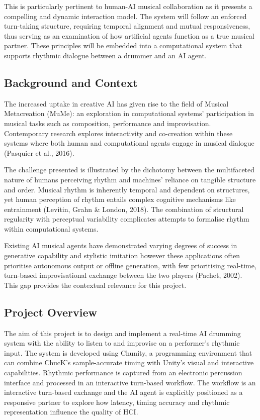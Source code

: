 \documentclass[11pt,a4paper]{article}
\begin{document}
This is particularly pertinent to human-AI musical collaboration as it presents a compelling and dynamic interaction model. The system will follow an enforced turn-taking structure, requiring temporal alignment and mutual responsiveness, thus serving as an examination of how artificial agents function as a true musical partner. These principles will be embedded into a computational system that supports rhythmic dialogue between a drummer and an AI agent.

\subsection{Background and Context}
The increased uptake in creative AI has given rise to the field of Musical Metacreation (MuMe): an exploration in computational systems’ participation in musical tasks such as composition, performance and improvisation. Contemporary research explores interactivity and co-creation within these systems where both human and computational agents engage in musical dialogue (Pasquier et al., 2016).

The challenge presented is illustrated by the dichotomy between the multifaceted nature of humans perceiving rhythm and machines’ reliance on tangible structure and order. Musical rhythm is inherently temporal and dependent on structures, yet human perception of rhythm entails complex cognitive mechanisms like entrainment (Levitin, Grahn \& London, 2018). The combination of structural regularity with perceptual variability complicates attempts to formalise rhythm within computational systems.

Existing AI musical agents have demonstrated varying degrees of success in generative capability and stylistic imitation however these applications often prioritise autonomous output or offline generation, with few prioritising real-time, turn-based improvisational exchange between the two players (Pachet, 2002). This gap provides the contextual relevance for this project.

\subsection{Project Overview}
The aim of this project is to design and implement a real-time AI drumming system with the ability to listen to and improvise on a performer’s rhythmic input. The system is developed using Chunity, a programming environment that can combine ChucK’s sample-accurate timing with Unity’s visual and interactive capabilities. Rhythmic performance is captured from an electronic percussion interface and processed in an interactive turn-based workflow. The workflow is an interactive turn-based exchange and the AI agent is explicitly positioned as a responsive partner to explore how latency, timing accuracy and rhythmic representation influence the quality of HCI.
\end{document}
